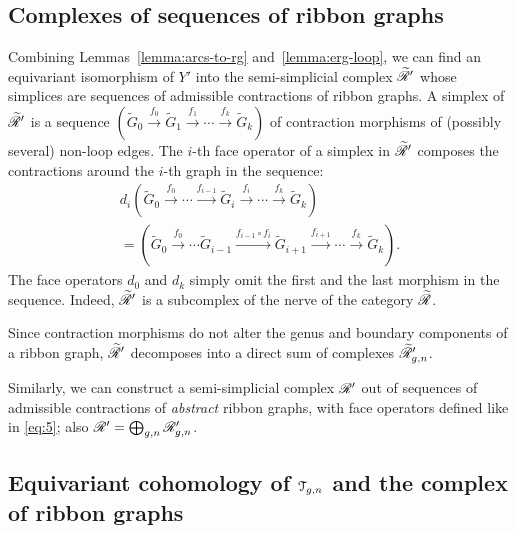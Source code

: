 \subsection{Complexes of sequences of ribbon graphs}
\label{sec:sequences}

Combining Lemmas~\ref{lemma:arcs-to-rg} and~\ref{lemma:erg-loop}, we
can find an equivariant isomorphism of $Y'$ into the semi-simplicial
complex $\mathscr{\widetilde R}'$ whose simplices are sequences of admissible
contractions of ribbon graphs.  A simplex of $\mathscr{\widetilde R}'$ is a sequence
$({\tilde G}_0 \overset{f_0}\to {\tilde G}_1 \overset{f_1}\to \cdots
\overset{f_k}\to {\tilde G}_k)$ of contraction morphisms of (possibly
several) non-loop edges.  The $i$-th face operator of a simplex in
$\mathscr{\widetilde R}'$ composes the contractions around the $i$-th graph in the
sequence:
\begin{multline}
  \label{eq:5}
  d_i({\tilde G}_0 \overset{f_0}\to \cdots \xrightarrow{f_{i-1}} {\tilde
    G}_i \overset{f_i}\to \cdots \overset{f_k}\to {\tilde G}_k) \\
  = ({\tilde G}_0 \overset{f_0}\to \cdots {\tilde
    G}_{i-1} \xrightarrow{f_{i-1} \circ f_i} {\tilde G_{i+1}} 
    \xrightarrow{f_{i+1}} \cdots \overset{f_k}\to {\tilde G}_k).
\end{multline}
The face operators $d_0$ and $d_k$ simply omit the first and the last
morphism in the sequence.  Indeed, $\mathscr{\widetilde R}'$ is a subcomplex of the
nerve of the category $\mathscr{\widetilde R}$.

Since contraction morphisms do not alter the genus and boundary
components of a ribbon graph, $\mathscr{\widetilde R}'$ decomposes into a direct sum of
complexes $\mathscr{\widetilde R}'_{g,n}$.

Similarly, we can construct a semi-simplicial complex $\mathscr{R}'$ out of
sequences of admissible contractions of \emph{abstract} ribbon graphs,
with face operators defined like in \eqref{eq:5}; also $\mathscr{R}' = \bigoplus_{g,n}
\mathscr{R}_{g,n}'$.


\subsection{Equivariant cohomology of $\mathcal{T}_{g,n}$ and the complex of ribbon graphs}
\label{sec:rg-complex}

